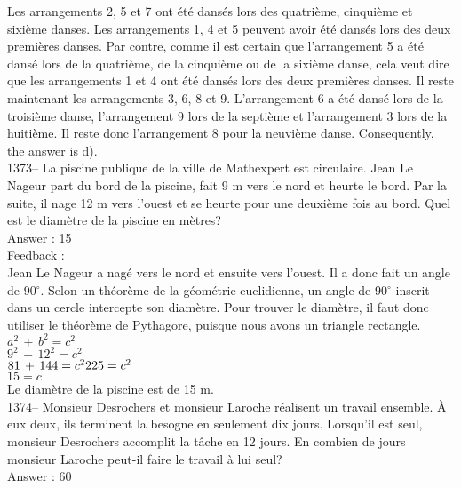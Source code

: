 \documentclass[letterpaper, 12pt]{article}
\begin{document}
Les arrangements 2, 5 et 7 ont \'et\'e dans\'es lors des quatri\`eme,
cinqui\`eme et sixi\`eme danses.  Les arrangements 1, 4 et 5 peuvent avoir
\'et\'e dans\'es lors des deux premi\`eres danses.  Par contre, comme il est
certain que l'arrangement 5 a \'et\'e dans\'e lors de la quatri\`eme, de la
cinqui\`eme ou de la sixi\`eme danse, cela veut dire que les arrangements 1
et 4 ont \'et\'e dans\'es lors des deux premi\`eres danses.  Il reste
maintenant les arrangements 3, 6, 8 et 9.  L'arrangement 6 a \'et\'e dans\'e
lors de la troisi\`eme danse, l'arrangement 9 lors de la septi\`eme et
l'arrangement 3 lors de la huiti\`eme.  Il reste donc l'arrangement 8 pour
la neuvi\`eme danse.  Consequently, the answer is d).\\

1373-- La piscine publique de la ville de Mathexpert est circulaire.
Jean Le Nageur part du bord de la piscine, fait 9 m vers le nord et
heurte le bord.  Par la suite, il nage 12 m vers l'ouest
et se heurte pour une deuxi\`eme fois au bord.  Quel est le diam\`etre de la
piscine en m\`etres?\\

Answer : 15\\

Feedback : \\
Jean Le Nageur a nag\'e vers le nord et ensuite vers l'ouest.  Il a donc
fait un angle de 90$^{\circ}$.  Selon un th\'eor\`eme de la g\'eom\'etrie
euclidienne, un angle de 90$^{\circ}$ inscrit dans un cercle intercepte son
diam\`etre.  Pour trouver le diam\`etre, il faut donc utiliser le
th\'eor\`eme de Pythagore, puisque nous avons un triangle rectangle.  \\
$a^{2}\,+\,b^{2}=c^{2}$\\
$9^{2}\,+\,12^{2}=c^{2}$\\
$81\,+\,144=c^{2}\\
225=c^{2}$\\
$15=c$\\
Le diam\`etre de la piscine est de 15 m.\\

1374-- Monsieur Desrochers et monsieur Laroche r\'ealisent un travail
ensemble.  \`A eux deux, ils terminent la besogne en seulement dix jours.
Lorsqu'il est seul, monsieur Desrochers accomplit la t\^ache en 12 jours.
En combien de jours monsieur Laroche peut-il faire le travail \`a lui
seul?\\

Answer : 60\\
\end{document}
